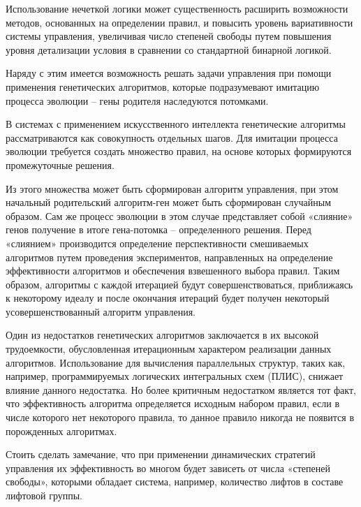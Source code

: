 	Использование нечеткой логики может существенность расширить возможности методов,
		основанных на определении правил, и повысить уровень вариативности системы управления,
		увеличивая число степеней свободы путем повышения уровня детализации условия
		в сравнении со стандартной бинарной логикой.

	Наряду с этим имеется возможность решать задачи управления при помощи применения
		генетических алгоритмов, которые подразумевают имитацию процесса эволюции – гены родителя наследуются потомками.

	В системах с применением искусственного интеллекта генетические алгоритмы рассматриваются
		как совокупность отдельных шагов. Для имитации процесса эволюции
		требуется создать множество правил, на основе которых формируются промежуточные решения.

	Из этого множества может быть сформирован алгоритм управления,
		при этом начальный родительский алгоритм-ген может быть сформирован случайным образом.
		Сам же процесс эволюции в этом случае представляет собой «слияние» генов получение
		в итоге гена-потомка – определенного решения.
		Перед «слиянием» производится определение перспективности смешиваемых алгоритмов
		путем проведения экспериментов, направленных на определение эффективности алгоритмов
		и обеспечения взвешенного выбора правил. Таким образом, алгоритмы с каждой итерацией
		будут совершенствоваться, приближаясь к некоторому идеалу и после окончания итераций
		будет получен некоторый усовершенствованный алгоритм управления.

	Один из недостатков генетических алгоритмов заключается в их высокой трудоемкости,
		обусловленная итерационным характером реализации данных алгоритмов.
		Использование для вычисления параллельных структур, таких как, например,
		программируемых логических интегральных схем (ПЛИС),
		снижает влияние данного недостатка. Но более критичным недостатком является тот факт,
		что эффективность алгоритма определяется исходным набором правил,
		если в числе которого нет некоторого правила, то данное правило никогда не появится в порожденных алгоритмах.

	Стоить сделать замечание, что при применении динамических стратегий управления их эффективность
		во многом будет зависеть от числа «степеней свободы», которыми обладает система,
		например, количество лифтов в составе лифтовой группы.
